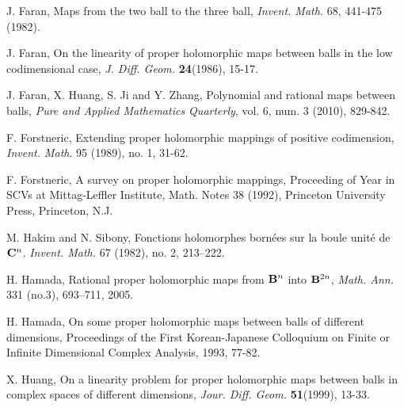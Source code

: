 \documentclass[12pt]{article}
\numberwithin{equation}{section}
\begin{document}
\begin{thebibliography}{99999}


 J. Faran, Maps from the two ball to the three ball,
{\it Invent. Math.} 68, 441-475 (1982).

 J. Faran, {On the linearity of proper holomorphic
maps between balls in the low codimensional case}, {\it J. Diff.
Geom.} \textbf{24}(1986), 15-17.



 J. Faran, X. Huang, S. Ji and Y. Zhang, Polynomial
and rational maps between balls, {\it Pure and Applied Mathematics Quarterly},
vol. 6, num. 3 (2010), 829-842.

 F. Forstneric,  Extending proper holomorphic
mappings of positive codimension, {\it Invent. Math}. 95 (1989), no. 1, 31-62.


 F. Forstneric, A survey on proper holomorphic mappings,
Proceeding of Year in SCVs at Mittag-Leffler Institute, Math. Notes
38 (1992),  Princeton University Press,  Princeton, N.J.



 M. Hakim and N. Sibony,
 Fonctions holomorphes born\'{e}es sur la boule unit\'{e} de ${\bf C}^{n}$.
{\it Invent. Math.} 67 (1982), no. 2, 213--222.


 H. Hamada, { Rational proper holomorphic maps from
${\bf{B}}^n$ into ${\bf{B}}^{2n}$},  {\it Math. Ann.}  331 (no.3),
693--711, 2005.


 H. Hamada,  On some proper holomorphic maps between balls
of different dimensions, Proceedings of the First Korean-Japanese
Colloquium on Finite or Infinite Dimensional Complex Analysis, 1993,
77-82.


 X. Huang, { On a linearity problem for proper
holomorphic maps between balls in complex spaces of
  different dimensions}, {\it Jour. Diff. Geom.}
  \textbf{51}(1999), 13-33.


\end{thebibliography}
\end{document}
